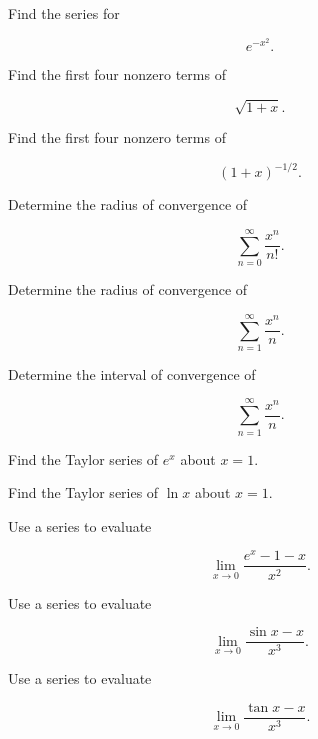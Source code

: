 \begin{exercise}[2]
Find the series for

\[
e^{-x^2}.
\]
\end{exercise}

\begin{exercise}[2]
Find the first four nonzero terms of

\[
\sqrt{1+x}.
\]
\end{exercise}

\begin{exercise}[2]
Find the first four nonzero terms of

\[
(1+x)^{-1/2}.
\]
\end{exercise}

\begin{exercise}[2]
Determine the radius of convergence of

\[
\sum_{n=0}^{\infty}
\frac{x^n}{n!}.
\]
\end{exercise}

\begin{exercise}[2]
Determine the radius of convergence of

\[
\sum_{n=1}^{\infty}
\frac{x^n}{n}.
\]
\end{exercise}

\begin{exercise}[3]
Determine the interval of convergence of

\[
\sum_{n=1}^{\infty}
\frac{x^n}{n}.
\]
\end{exercise}

\begin{exercise}[3]
Find the Taylor series of \(e^x\) about \(x=1\).
\end{exercise}

\begin{exercise}[3]
Find the Taylor series of \(\ln x\) about \(x=1\).
\end{exercise}

\begin{exercise}[3]
Use a series to evaluate

\[
\lim_{x\to0}
\frac{
e^x-1-x
}{
x^2
}.
\]
\end{exercise}

\begin{exercise}[3]
Use a series to evaluate

\[
\lim_{x\to0}
\frac{
\sin x-x
}{
x^3
}.
\]
\end{exercise}

\begin{exercise}[3]
Use a series to evaluate

\[
\lim_{x\to0}
\frac{
\tan x-x
}{
x^3
}.
\]
\end{exercise}

